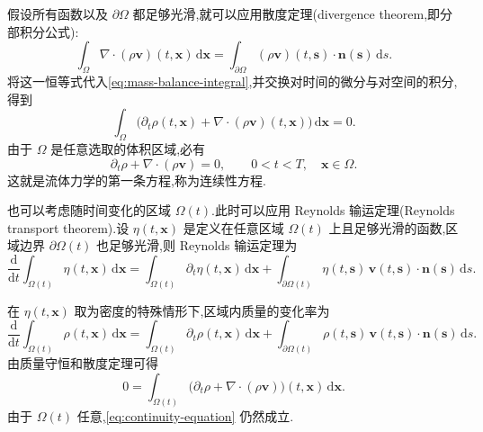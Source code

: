 假设所有函数以及 $\partial\Omega$ 都足够光滑,就可以应用散度定理(divergence theorem,即分部积分公式):
\begin{equation*}
  \int_{\Omega}\nabla\cdot(\rho\bm{v})(t,\bm{x})\,\mathrm{d}\bm{x}
  =\int_{\partial\Omega}(\rho\bm{v})(t,\bm{s})\cdot\bm{n}(\bm{s})\,\mathrm{d}s.
\end{equation*}
将这一恒等式代入\cref{eq:mass-balance-integral},并交换对时间的微分与对空间的积分,得到
\begin{equation*}
  \int_{\Omega}\bigl(\partial_t\rho(t,\bm{x})+
    \nabla\cdot(\rho\bm{v})(t,\bm{x})\bigr)\,\mathrm{d}\bm{x}=0.
\end{equation*}
由于 $\Omega$ 是任意选取的体积区域,必有
\begin{equation}\label{eq:continuity-equation}
  \partial_t\rho+\nabla\cdot(\rho\bm{v})=0,
  \qquad 0<t<T,\quad\bm{x}\in\Omega.
\end{equation}
这就是流体力学的第一条方程,称为连续性方程.

\begin{note}[随时间变化的区域]\label{note:time-dependent-domain}
也可以考虑随时间变化的区域 $\Omega(t)$.此时可以应用 Reynolds 输运定理(Reynolds transport theorem).设 $\eta(t,\bm{x})$ 是定义在任意区域 $\Omega(t)$ 上且足够光滑的函数,区域边界 $\partial\Omega(t)$ 也足够光滑,则 Reynolds 输运定理为
\begin{equation}\label{eq:reynolds-transport}
  \frac{\mathrm{d}}{\mathrm{d}t}\int_{\Omega(t)}\eta(t,\bm{x})\,\mathrm{d}\bm{x}
  =\int_{\Omega(t)}\partial_t\eta(t,\bm{x})\,\mathrm{d}\bm{x}
   +\int_{\partial\Omega(t)}\eta(t,\bm{s})\,\bm{v}(t,\bm{s})\cdot\bm{n}(\bm{s})\,\mathrm{d}s.
\end{equation}
\end{note}

在 $\eta(t,\bm{x})$ 取为密度的特殊情形下,区域内质量的变化率为
\begin{equation*}
  \frac{\mathrm{d}}{\mathrm{d}t}\int_{\Omega(t)}\rho(t,\bm{x})\,\mathrm{d}\bm{x}
  =\int_{\Omega(t)}\partial_t\rho(t,\bm{x})\,\mathrm{d}\bm{x}
   +\int_{\partial\Omega(t)}\rho(t,\bm{s})\,\bm{v}(t,\bm{s})\cdot\bm{n}(\bm{s})\,\mathrm{d}s.
\end{equation*}
由质量守恒和散度定理可得
\begin{equation*}
  0=\int_{\Omega(t)}\bigl(\partial_t\rho+\nabla\cdot(\rho\bm{v})\bigr)(t,\bm{x})\,\mathrm{d}\bm{x}.
\end{equation*}
由于 $\Omega(t)$ 任意,\cref{eq:continuity-equation} 仍然成立.

